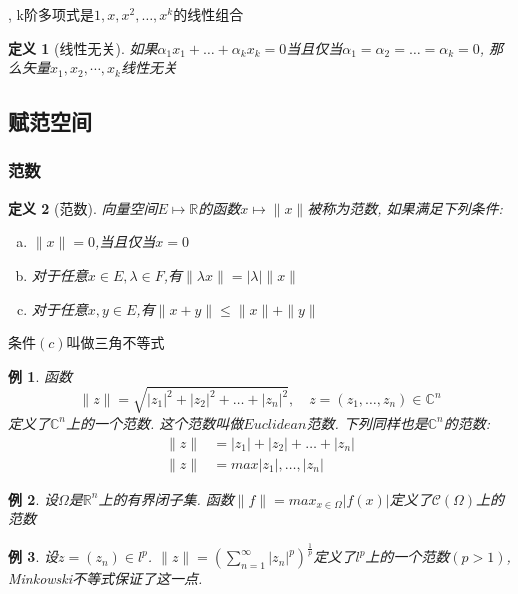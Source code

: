 \documentclass[a4paper,11pt]{article}
\newtheorem{definition}{\hspace{2em}定义}[section]
\newtheorem{example}{例}[section]
\begin{document}
, k阶多项式是$1,x,x^2,\dots,x^k$的线性组合

\begin{definition}[线性无关]
  如果$\alpha_1x_1+\dots+\alpha_kx_k=0$当且仅当$\alpha_1=\alpha_2=\dots=\alpha_k=0$, 那么矢量${x_1,x_2,\cdots,x_k}$线性无关
\end{definition}
\subsection{赋范空间}
\subsubsection*{范数}
\begin{definition}[范数]
  向量空间$E\mapsto\mathbb{R}$的函数$x\mapsto\|x\|$被称为范数, 如果满足下列条件:
  \begin{enumerate}[(a)]
    \item $\|x\|=0$,当且仅当$x=0$
    \item 对于任意$x\in E,\lambda\in F$,有$\|\lambda x\|=|\lambda|\|x\|$
    \item 对于任意$x,y\in E$,有$\|x+y\|\leq\|x\|+\|y\|$
  \end{enumerate}
\end{definition}
条件$(c)$叫做三角不等式
\begin{example}
  函数
  \begin{equation*}
    \|z\|=\sqrt{|z_1|^2+|z_2|^2+\dots+|z_n|^2},\quad z=(z_1,\dots,z_n)\in\mathbb{C}^n
  \end{equation*}
  定义了$\mathbb{C}^n$上的一个范数. 这个范数叫做$Euclidean$范数. 下列同样也是$\mathbb{C}^n$的范数:
  \begin{equation*}
    \begin{split}
       \|z\| & =|z_1|+|z_2|+\dots+|z_n| \\
       \|z\| & =max{|z_1|,\dots,|z_n|}
    \end{split}
  \end{equation*}
\end{example}
\begin{example}\label{norm1}
  设$\Omega$是$\mathbb{R}^n$上的有界闭子集. 函数$\|f\|=max_{x\in\Omega}|f(x)|$定义了$\mathcal{C}(\Omega)$上的范数
\end{example}
\begin{example}\label{norm2}
  设$z=(z_n)\in l^p$. $\|z\|=(\sum_{n=1}^{\infty}|z_n|^p)^\frac{1}{p}$定义了$l^p$上的一个范数$(p>1)$, Minkowski不等式保证了这一点.
\end{example}
\end{document}
